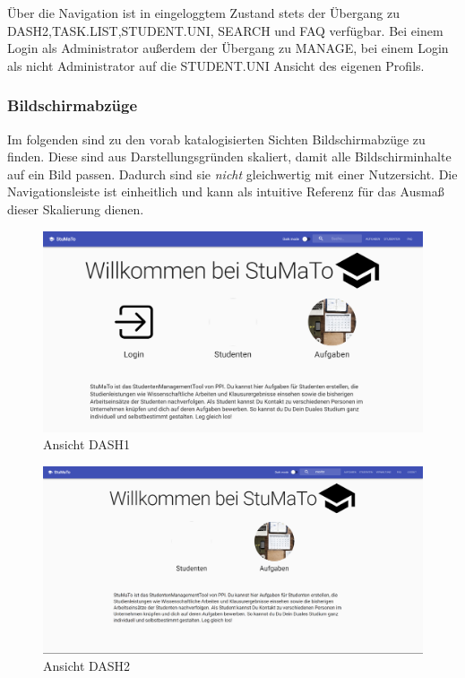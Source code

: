 \documentclass[
  12pt,
  ngerman,
  a4paper,
]{article}
\begin{document}
Über die Navigation ist in eingeloggtem Zustand stets der Übergang zu
DASH2,TASK.LIST,STUDENT.UNI, SEARCH und FAQ verfügbar. Bei einem Login
als Administrator außerdem der Übergang zu MANAGE, bei einem Login als
nicht Administrator auf die STUDENT.UNI Ansicht des eigenen Profils.

\hypertarget{bildschirmabzuxfcge}{%
\subsubsection{Bildschirmabzüge}\label{bildschirmabzuxfcge}}

Im folgenden sind zu den vorab katalogisierten Sichten Bildschirmabzüge
zu finden. Diese sind aus Darstellungsgründen skaliert, damit alle
Bildschirminhalte auf ein Bild passen. Dadurch sind sie \emph{nicht}
gleichwertig mit einer Nutzersicht. Die Navigationsleiste ist
einheitlich und kann als intuitive Referenz für das Ausmaß dieser
Skalierung dienen.

\begin{figure}
\centering
\includegraphics{./tex2pdf.-c803d322dfea80aa/fe0842637e9fead37869fdcec161ed1e5a86af1b.png}
\caption{Ansicht DASH1}
\end{figure}

\begin{figure}
\centering
\includegraphics{./tex2pdf.-c803d322dfea80aa/e6625bd35d85ef948eab18a123670b53a969f56c.png}
\caption{Ansicht DASH2}
\end{figure}
\end{document}
